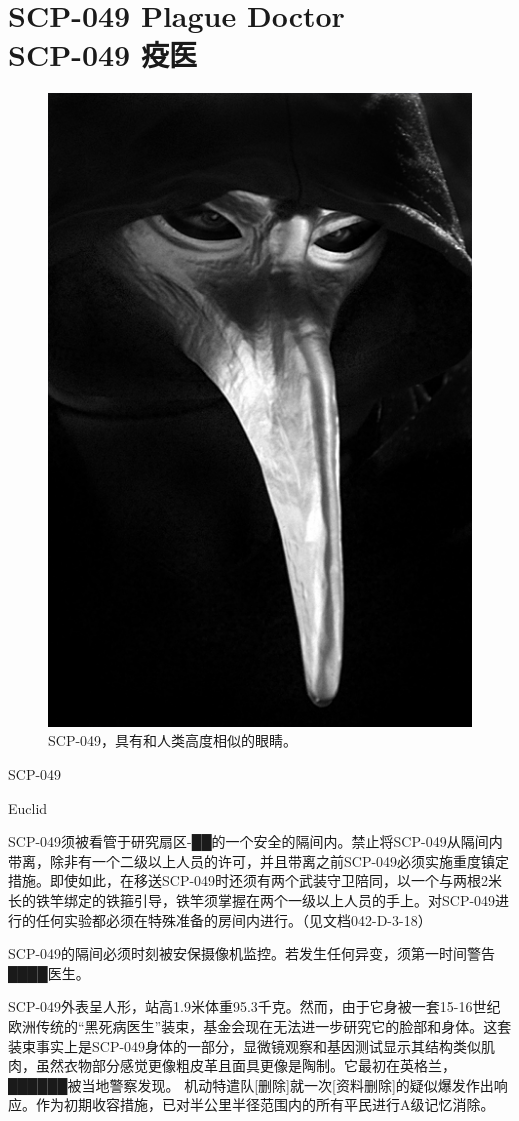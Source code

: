 \chapter[SCP-049 疫医]{
    SCP-049 Plague Doctor\\
    SCP-049 疫医
}

\label{chap:SCP-049}

\begin{figure}[H]
    \centering
    \includegraphics[width=0.5\linewidth]{images/SCP-049.jpg}
    \caption*{SCP-049，具有和人类高度相似的眼睛。}
\end{figure}

SCP-049

Euclid

SCP-049须被看管于研究扇区-██的一个安全的隔间内。禁止将SCP-049从隔间内带离，除非有一个二级以上人员的许可，并且带离之前SCP-049必须实施重度镇定措施。即使如此，在移送SCP-049时还须有两个武装守卫陪同，以一个与两根2米长的铁竿绑定的铁箍引导，铁竿须掌握在两个一级以上人员的手上。对SCP-049进行的任何实验都必须在特殊准备的房间内进行。（见文档042-D-3-18）

SCP-049的隔间必须时刻被安保摄像机监控。若发生任何异变，须第一时间警告████医生。

SCP-049外表呈人形，站高1.9米体重95.3千克。然而，由于它身被一套15-16世纪欧洲传统的“黑死病医生”装束，基金会现在无法进一步研究它的脸部和身体。这套装束事实上是SCP-049身体的一部分，显微镜观察和基因测试显示其结构类似肌肉，虽然衣物部分感觉更像粗皮革且面具更像是陶制。它最初在英格兰，██████被当地警察发现。 机动特遣队{[}删除]就一次{[}资料删除]的疑似爆发作出响应。作为初期收容措施，已对半公里半径范围内的所有平民进行A级记忆消除。

